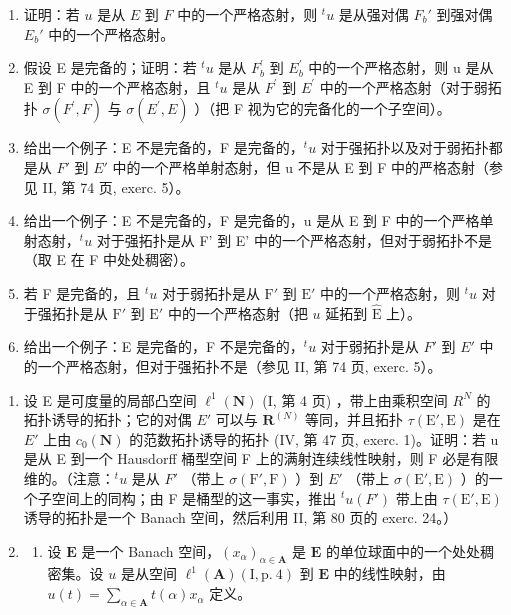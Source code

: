 \begin{enumerate}
\def\labelenumi{\alph{enumi})}
\item
  证明：若 \(u\) 是从 \(E\) 到 \(F\) 中的一个严格态射，则 \({}^t u\) 是从强对偶 \(F_b'\) 到强对偶 \(E_b'\) 中的一个严格态射。
\item
  假设 E 是完备的；证明：若 \(^{t}u\) 是从 \(F_{b}^{\prime}\) 到 \(E_{b}^{\prime}\) 中的一个严格态射，则 u 是从 E 到 F 中的一个严格态射，且 \(^{t}u\) 是从 \(F^{\prime}\) 到 \(E^{\prime}\) 中的一个严格态射（对于弱拓扑 \(\sigma(F^{\prime}, F)\) 与 \(\sigma(E^{\prime}, E)\) ）（把 F 视为它的完备化的一个子空间）。
\item
  给出一个例子：E 不是完备的，F 是完备的，\(^{t}u\) 对于强拓扑以及对于弱拓扑都是从 \(F'\) 到 \(E'\) 中的一个严格单射态射，但 u 不是从 E 到 F 中的严格态射（参见 II, 第 74 页, exerc. 5）。
\item
  给出一个例子：E 不是完备的，F 是完备的，u 是从 E 到 F 中的一个严格单射态射，\(^{t}u\) 对于强拓扑是从 F' 到 E' 中的一个严格态射，但对于弱拓扑不是（取 E 在 F 中处处稠密）。
\item
  若 F 是完备的，且 \({}^t u\) 对于弱拓扑是从 \(\mathrm{F}'\) 到 \(\mathrm{E}'\) 中的一个严格态射，则 \({}^t u\) 对于强拓扑是从 \(\mathrm{F}'\) 到 \(\mathrm{E}'\) 中的一个严格态射（把 \(u\) 延拓到 \(\hat{\mathrm{E}}\) 上）。
\item
  给出一个例子：E 是完备的，F 不是完备的，\(^{t}u\) 对于弱拓扑是从 \(F'\) 到 \(E'\) 中的一个严格态射，但对于强拓扑不是（参见 II, 第 74 页, exerc. 5）。
\end{enumerate}

\begin{enumerate}
\def\labelenumi{\arabic{enumi})}
\setcounter{enumi}{5}
\item
  设 E 是可度量的局部凸空间 \(\ell^{1}(\mathbf{N})\) (I, 第 4 页) ，带上由乘积空间 \(R^{N}\) 的拓扑诱导的拓扑；它的对偶 \(E'\) 可以与 \(\mathbf{R}^{(N)}\) 等同，并且拓扑 \(\tau(\mathrm{E}',\mathrm{E})\) 是在 \(E'\) 上由 \(c_{0}(\mathbf{N})\) 的范数拓扑诱导的拓扑 (IV, 第 47 页, exerc. 1)。证明：若 u 是从 E 到一个 Hausdorff 桶型空间 F 上的满射连续线性映射，则 F 必是有限维的。（注意：\({}^{t}u\) 是从 \(F'\) （带上 \(\sigma(\mathrm{F}',\mathrm{F})\) ）到 \(E'\) （带上 \(\sigma(\mathrm{E}',\mathrm{E})\) ）的一个子空间上的同构；由 F 是桶型的这一事实，推出 \({}^{t}u(F')\) 带上由 \(\tau(\mathrm{E}',\mathrm{E})\) 诱导的拓扑是一个 Banach 空间，然后利用 II, 第 80 页的 exerc. 24。）
\item
  \begin{enumerate}
  \def\labelenumii{\alph{enumii})}
  \tightlist
  \item
    设 \(\mathbf{E}\) 是一个 Banach 空间，\((x_{\alpha})_{\alpha \in \mathbf{A}}\) 是 \(\mathbf{E}\) 的单位球面中的一个处处稠密集。设 \(u\) 是从空间 \(\ell^1 (\mathbf{A})(\mathrm{I},\mathrm{p.~4})\) 到 \(\mathbf{E}\) 中的线性映射，由 \(u(t) = \sum_{\alpha \in \mathbf{A}}t(\alpha)x_{\alpha}\) 定义。
  \end{enumerate}
\end{enumerate}

